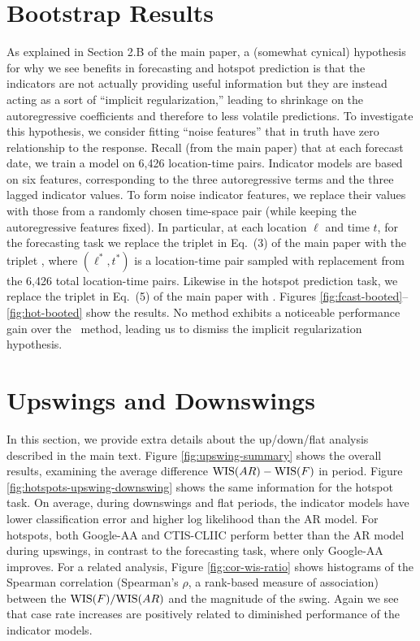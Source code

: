 \section{Bootstrap Results}

As explained in Section 2.B of the main paper, a (somewhat cynical) hypothesis
for why we see benefits in forecasting and hotspot prediction is that the
indicators are not actually providing useful information but they are instead
acting as a sort of ``implicit regularization,'' leading to shrinkage on the
autoregressive coefficients and therefore to less volatile predictions.  To
investigate this hypothesis, we consider fitting ``noise features'' that in
truth have zero relationship to the response.  Recall (from the main paper) that
at each forecast date, we train a model on 6,426 location-time pairs.  Indicator
models are based on six features, corresponding to the three autoregressive
terms and the three lagged indicator values.  To form noise indicator features,
we replace their values with those from a randomly chosen time-space pair (while
keeping the autoregressive features fixed).  In particular, at each location
$\ell$ and time $t$, for the forecasting task we replace the triplet
 in Eq.\ (3) of the main
paper with the triplet , where $(\ell^*,t^*)$ is a location-time pair sampled with
replacement from the 6,426 total location-time pairs.  Likewise in the hotspot 
prediction task, we replace the triplet  in Eq.\ (5) of the main paper with
.  Figures
\ref{fig:fcast-booted}--\ref{fig:hot-booted} show the results.  No method
exhibits a noticeable performance gain over the \ar~method, leading us to
dismiss the implicit regularization hypothesis. 

\section{Upswings and Downswings}

In this section, we provide extra details about the up/down/flat analysis
described in the main text. Figure \ref{fig:upswing-summary} shows the overall
results, examining the average difference $\mathrm{WIS}(AR) - \mathrm{WIS}(F)$ in period. Figure
\ref{fig:hotspots-upswing-downswing} shows the same information for the hotspot
task. On average, during downswings and flat periods, the indicator models have
lower classification error and higher log likelihood than the AR model. For
hotspots, both Google-AA and CTIS-CLIIC perform better than the AR model during
upswings, in contrast to the forecasting task, where only Google-AA
improves. For a related analysis, Figure \ref{fig:cor-wis-ratio} shows
histograms of the Spearman correlation (Spearman's $\rho$, a rank-based measure
of association) between the $\mathrm{WIS}(F)/\mathrm{WIS}(AR)$ and the magnitude of the
swing. Again we see that case rate increases are positively related to
diminished performance of the indicator models.

